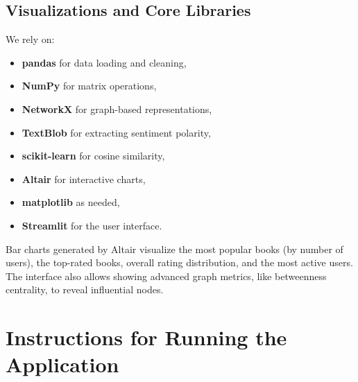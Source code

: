 \documentclass[12pt]{article}
\begin{document}
\subsection*{Visualizations and Core Libraries}

We rely on:
\begin{itemize}
    \item \textbf{pandas} for data loading and cleaning,
    \item \textbf{NumPy} for matrix operations,
    \item \textbf{NetworkX} for graph-based representations,
    \item \textbf{TextBlob} for extracting sentiment polarity,
    \item \textbf{scikit-learn} for cosine similarity,
    \item \textbf{Altair} for interactive charts,
    \item \textbf{matplotlib} as needed,
    \item \textbf{Streamlit} for the user interface.
\end{itemize}
Bar charts generated by Altair visualize the most popular books (by number of users), the top-rated books, overall rating distribution, and the most active users. The interface also allows showing advanced graph metrics, like betweenness centrality, to reveal influential nodes.

\section{Instructions for Running the Application}
\end{document}
